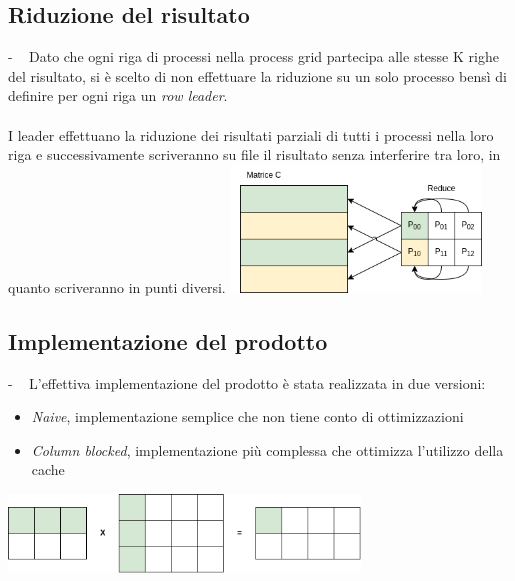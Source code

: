 \documentclass[compress]{beamer}
\begin{document}
\subsection{Riduzione del risultato}
\begin{frame}{\secname \text{ }- \subsecname\ }
    Dato che ogni riga di processi nella process grid partecipa alle stesse K righe del risultato, si è scelto di non effettuare la riduzione su un solo processo bensì di definire per ogni riga un \textit{row leader}. \\\\I leader effettuano la riduzione dei risultati parziali di tutti i processi nella loro riga e successivamente scriveranno su file il risultato senza interferire tra loro, in quanto scriveranno in punti diversi.
    \begin{adjustbox}{margin=0cm 0cm 0cm 0.3cm, center} %
        \includegraphics[width=0.5\textwidth]{resources/reduce.png}
    \end{adjustbox}
\end{frame}

\subsection{Implementazione del prodotto}
\begin{frame}{\secname \text{ }- \subsecname\ }
    L'effettiva implementazione del prodotto è stata realizzata in due versioni:
    \vspace{0.3cm}
    \begin{itemize}
        \item \textit{Naive}, implementazione semplice che non tiene conto di ottimizzazioni
        \item \textit{Column blocked}, implementazione più complessa che ottimizza l'utilizzo della cache
    \end{itemize}
    \begin{adjustbox}{margin=0cm 0cm 0cm 0.7cm, center} %
        \includegraphics[width=0.7\textwidth]{resources/product_icon.png}
    \end{adjustbox}
\end{frame}
\end{document}
